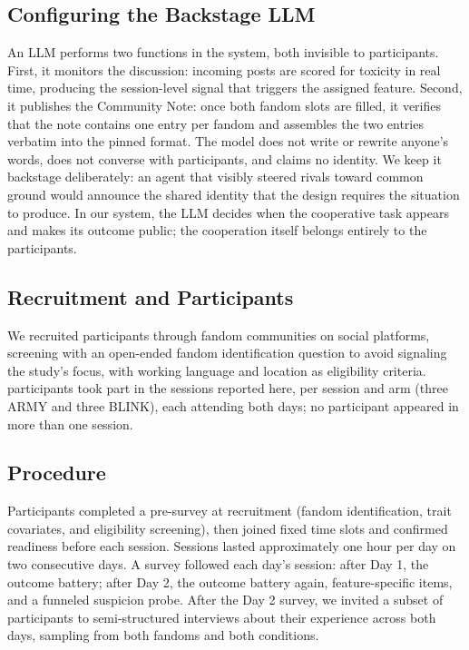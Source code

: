 \documentclass[manuscript,screen,review,anonymous]{acmart}
\begin{document}
\subsection{Configuring the Backstage LLM}

An LLM performs two functions in the system, both invisible to participants.
First, it monitors the discussion: incoming posts are scored for toxicity in
real time, producing the session-level signal that triggers the assigned
feature. Second, it publishes the Community Note: once both fandom slots are
filled, it verifies that the note contains one entry per fandom and assembles
the two entries verbatim into the pinned format. The model does not write or
rewrite anyone's words, does not converse with participants, and claims no
identity. We keep it backstage deliberately: an agent that visibly steered
rivals toward common ground would announce the shared identity that the
design requires the situation to produce. In our system, the LLM decides when
the cooperative task appears and makes its outcome public; the cooperation
itself belongs entirely to the participants.

\subsection{Recruitment and Participants}

We recruited participants through fandom communities on social platforms,
screening with an open-ended fandom identification question to avoid
signaling the study's focus, with working language and location as
eligibility criteria. \StatnParticipants{} participants took part in the
sessions reported here, \StatnPerSession{} per session and arm (three ARMY
and three BLINK), each attending both days; no participant appeared in more
than one session.

\subsection{Procedure}

Participants completed a pre-survey at recruitment (fandom identification,
trait covariates, and eligibility screening), then joined fixed time slots
and confirmed readiness before each session. Sessions lasted approximately
one hour per day on two consecutive days. A survey followed each day's
session: after Day 1, the outcome battery; after Day 2, the outcome battery
again, feature-specific items, and a funneled suspicion probe. After the Day
2 survey, we invited a subset of participants to semi-structured interviews
about their experience across both days, sampling from both fandoms and both
conditions.
\end{document}

